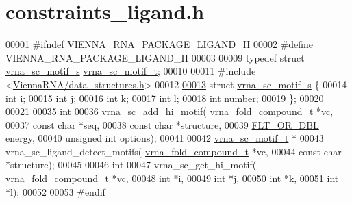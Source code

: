 \hypertarget{constraints__ligand_8h_source}{}\section{constraints\+\_\+ligand.\+h}
\label{constraints__ligand_8h_source}

\begin{DoxyCode}
00001 \textcolor{preprocessor}{#ifndef VIENNA\_RNA\_PACKAGE\_LIGAND\_H}
00002 \textcolor{preprocessor}{#define VIENNA\_RNA\_PACKAGE\_LIGAND\_H}
00003 
00009 \textcolor{keyword}{typedef} \textcolor{keyword}{struct }\hyperlink{structvrna__sc__motif__s}{vrna\_sc\_motif\_s}  \hyperlink{structvrna__sc__motif__s}{vrna\_sc\_motif\_t};
00010 
00011 \textcolor{preprocessor}{#include <\hyperlink{data__structures_8h}{ViennaRNA/data\_structures.h}>}
00012 
\hyperlink{structvrna__sc__motif__s}{00013} \textcolor{keyword}{struct }\hyperlink{structvrna__sc__motif__s}{vrna\_sc\_motif\_s} \{
00014   \textcolor{keywordtype}{int} i;
00015   \textcolor{keywordtype}{int} j;
00016   \textcolor{keywordtype}{int} k;
00017   \textcolor{keywordtype}{int} l;
00018   \textcolor{keywordtype}{int} number;
00019 \};
00020 
00021 
00035 \textcolor{keywordtype}{int}
00036 \hyperlink{group__constraints__ligand_gaa6ff0113a3a76dc0b8d62961f4e1dfa0}{vrna\_sc\_add\_hi\_motif}( \hyperlink{group__fold__compound_structvrna__fc__s}{vrna\_fold\_compound\_t} *vc,
00037                       \textcolor{keyword}{const} \textcolor{keywordtype}{char} *seq,
00038                       \textcolor{keyword}{const} \textcolor{keywordtype}{char} *structure,
00039                       \hyperlink{group__data__structures_ga31125aeace516926bf7f251f759b6126}{FLT\_OR\_DBL} energy,
00040                       \textcolor{keywordtype}{unsigned} \textcolor{keywordtype}{int} options);
00041 
00042 \hyperlink{structvrna__sc__motif__s}{vrna\_sc\_motif\_t} *
00043 vrna\_sc\_ligand\_detect\_motifs( \hyperlink{group__fold__compound_structvrna__fc__s}{vrna\_fold\_compound\_t} *vc,
00044                               \textcolor{keyword}{const} \textcolor{keywordtype}{char} *structure);
00045 
00046 \textcolor{keywordtype}{int}
00047 vrna\_sc\_get\_hi\_motif( \hyperlink{group__fold__compound_structvrna__fc__s}{vrna\_fold\_compound\_t} *vc,
00048                       \textcolor{keywordtype}{int} *i,
00049                       \textcolor{keywordtype}{int} *j,
00050                       \textcolor{keywordtype}{int} *k,
00051                       \textcolor{keywordtype}{int} *l);
00052 
00053 \textcolor{preprocessor}{#endif}
\end{DoxyCode}
